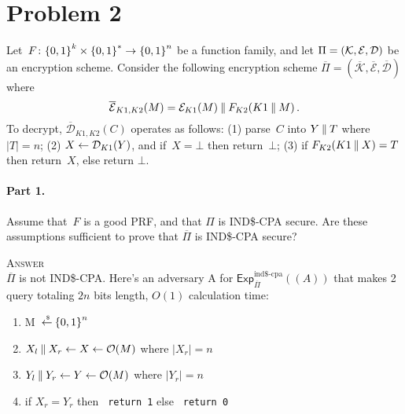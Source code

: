 \documentclass[11pt]{article}
\begin{document}
\newcommand{\oPi}{\overline{\Pi}}
\newcommand{\ocalK}{\overline{\mathcal{K}}}
\newcommand{\ocalE}{\overline{\mathcal{E}}}
\newcommand{\ocalD}{\overline{\mathcal{D}}}

\vspace*{-.25in}
\section*{Problem 2} Let~$F \colon {\{0,1\}}^k \times {\{0,1\}}^* \to {\{0,1\}}^n$
be a function family, and let $\Pi = ({\cal K},{\cal E},{\cal D})$ be an
encryption scheme.  Consider the following encryption scheme $\oPi =
(\ocalK,\ocalE,\ocalD)$ where 
\[
\ocalE_{K1,K2}(M) = \calE_{K1}(M)\concat F_{K2}(K1 \concat M)\, .
\]  
To decrypt, $\ocalD_{K1,K2}(C)$
operates as follows: (1) parse~$C$ into $Y \:\|\: T$ where $|T|=n$; (2) $X
\gets {\cal D}_{K1}(Y)$, and if~$X = \bot$ then return~$\bot$; (3) if
$F_{K2}(K1 \:\|\: X)=T$ then return~$X$, else return $\bot$.

\paragraph{Part 1.} Assume that~$F$ is a good PRF, and that $\Pi$ is IND\$-CPA secure.
Are these assumptions sufficient to prove that $\oPi$ is IND\$-CPA
secure?

\newcommand{\INDR}{IND\$-CPA}
\newcommand{\ExpINDz}[2]{\mathsf{Exp}^{\mathrm{ind}\mbox{-}\mathrm{cpa0}}_{#1}{(#2)}}
\newcommand{\ExpINDo}[2]{\mathsf{Exp}^{\mathrm{ind}\mbox{-}\mathrm{cpa1}}_{#1}{(#2)}}
\newcommand{\ExpINDR}[2]{\mathsf{Exp}^{\mathrm{ind\$}\mbox{-}\mathrm{cpa}}_{#1}{(#2)}}
\newcommand{\AdvINDR}[2]{\Adv^{\mathrm{ind\$}\mbox{-}\mathrm{cpa}}_{#1}(#2)}
\newcommand{\Exp}[3]{\mathsf{Exp}^{\mathrm{#1}}_{#2}{(#3)}}
\newcommand{\Adva}[3]{\mathsf{Adv}^{\mathrm{#1}}_{#2}{(#3)}}

\textsc{Answer} 
\\$\oPi$ is not \INDR. Here's an adversary A for $\ExpINDR{\oPi}{(A)}$ that makes 2 query totaling $2n$ bits length, $O(1)$ calculation time:
\begin{enumerate}
\item M ${\:\stackrel{{\scriptscriptstyle \hspace{0.2em}\$}} {\leftarrow}\:} {\{0,1\}}^n$
\item $X_l \:\|\: X_r \gets X \gets {\cal O}(M)$ where $|X_r| = n$
\item $Y_l \:\|\: Y_r \gets Y \gets {\cal O}(M)$ where $|Y_r| = n$
\item if $X_r = Y_r$ then \texttt{ return 1} else \texttt{ return 0}
\end{enumerate}
\end{document}
